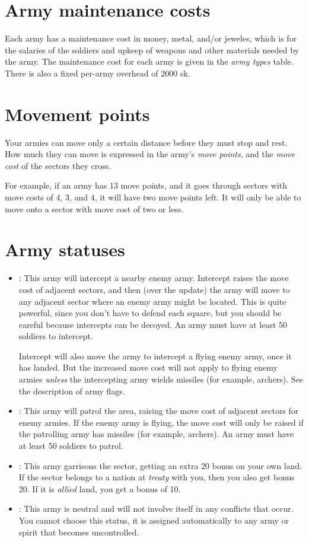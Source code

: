 \section{Army maintenance costs}
Each army has a maintenance cost in money, metal, and/or jeweles,
which is for the salaries of the soldiers and upkeep of weapons and
other materials needed by the army.  The maintenance cost for each
army is given in the {\em army types} table.  There is also a fixed
per-army overhead of 2000 sk.

\section{Movement points}
Your armies can move only a certain distance before they must stop and
rest.  How much they can move is expressed in the army's {\em move
points}, and the {\em move cost} of the sectors they cross.

For example, if an army has 13 move points, and it goes through
sectors with move costs of 4, 3, and 4, it will have two move points
left.  It will only be able to move onto a sector with move cost of
two or less.

\section{Army statuses}
\begin{itemize}
\item
{}: This army will intercept a nearby enemy army.
Intercept raises the move cost of adjacent sectors, and then (over the
update) the army will move to any adjacent sector where an enemy army
might be located.  This is quite powerful, since you don't have to
defend each square, but you should be careful because intercepts can
be decoyed.  An army must have at least 50 soldiers to intercept.

Intercept will also move the army to intercept a flying enemy army,
once it has landed.  But the increased move cost will not apply to flying
enemy armies {\em unless} the intercepting army wields missiles (for
example, archers).  See the description of army flags.

\item
{}: This army will patrol the area, raising the move cost
of adjacent sectors for enemy armies.  If the enemy army is flying,
the move cost will only be raised if the patrolling army has missiles
(for example, archers).  An army must have at least 50 soldiers to
patrol.

\item
{}: This army garrisons the sector, getting an extra
20 bonus on your own land.  If the sector belongs to a nation at {\em
treaty} with you, then you also get bonus 20.  If it is {\em allied}
land, you get a bonus of 10.

\item
{}: This army is neutral and will not involve itself in
any conflicts that occur.  You cannot choose this status, it is 
assigned automatically to any army or spirit that becomes uncontrolled.
\end{itemize}

